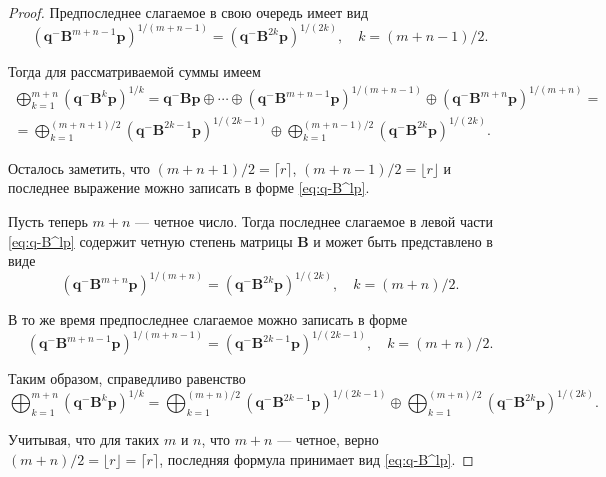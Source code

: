 \documentclass[specialist,
               substylefile = spbu.rtx,
               subf,href,colorlinks=true, 12pt]{disser}
\theoremstyle{definition}
\begin{document}
\begin{proof}
Предпоследнее слагаемое в свою очередь имеет вид
\begin{equation*}
(\bm{q}^{-}\bm{B}^{m+n-1}\bm{p})^{1/(m+n-1)}=
(\bm{q}^{-}\bm{B}^{2k}\bm{p})^{1/(2k)},
\quad
k=(m+n-1)/2.
\end{equation*}

Тогда для рассматриваемой суммы имеем
\begin{multline*}
\bigoplus_{k=1}^{m+n}
(
\bm{q}^{-}\bm{B}^{k}\bm{p}
)^{1/k}
=
\bm{q}^{-}\bm{B}\bm{p}
\oplus
\cdots
\oplus
(
\bm{q}^{-}\bm{B}^{m+n-1}\bm{p}
)^{1/(m+n-1)}
\oplus
(
\bm{q}^{-}\bm{B}^{m+n}\bm{p}
)^{1/(m+n)}
=\\=
\bigoplus_{k=1}^{(m+n+1)/2}
(
\bm{q}^{-}\bm{B}^{2k-1}\bm{p}
)^{1/(2k-1)}
\oplus
\bigoplus_{k=1}^{(m+n-1)/2}
(
\bm{q}^{-}\bm{B}^{2k}\bm{p}
)^{1/(2k)}.
\end{multline*}

Осталось заметить, что $(m+n+1)/2=\lceil r\rceil$, $(m+n-1)/2=\lfloor r\rfloor$ и последнее выражение можно записать в форме \eqref{eq:q-B^lp}.

Пусть теперь $m+n$ --- четное число. Тогда последнее слагаемое в левой части \eqref{eq:q-B^lp} содержит четную степень матрицы $\bm{B}$ и может быть представлено в виде
\begin{equation*}
(\bm{q}^{-}\bm{B}^{m+n}\bm{p})^{1/(m+n)}
=
(\bm{q}^{-}\bm{B}^{2k}\bm{p})^{1/(2k)},
\quad
k=(m+n)/2.
\end{equation*}

В то же время предпоследнее слагаемое можно записать в форме
\begin{equation*}
(\bm{q}^{-}\bm{B}^{m+n-1}\bm{p})^{1/(m+n-1)}
=
(\bm{q}^{-}\bm{B}^{2k-1}\bm{p})^{1/(2k-1)},
\quad
k=(m+n)/2.
\end{equation*}

Таким образом, справедливо равенство
\begin{equation*}
\bigoplus_{k=1}^{m+n}
(
\bm{q}^{-}\bm{B}^{k}\bm{p}
)^{1/k}
=
\bigoplus_{k=1}^{(m+n)/2}
(
\bm{q}^{-}\bm{B}^{2k-1}\bm{p}
)^{1/(2k-1)}
\oplus
\bigoplus_{k=1}^{(m+n)/2}
(
\bm{q}^{-}\bm{B}^{2k}\bm{p}
)^{1/(2k)}
.
\end{equation*}

Учитывая, что для таких $m$ и $n$, что $m+n$ --- четное, верно $(m+n)/2=\lfloor r\rfloor=\lceil r\rceil$, последняя формула принимает вид \eqref{eq:q-B^lp}.


\end{proof}
\end{document}
